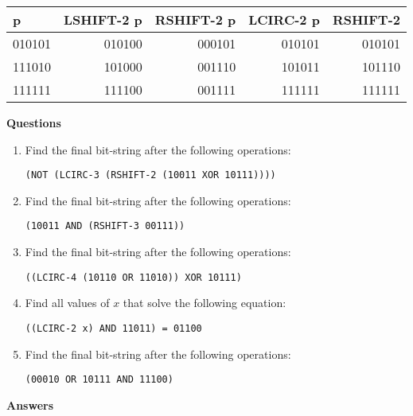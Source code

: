 \documentclass[12pt,letterpaper]{article}
\begin{document}
\begin{center}
  \begin{tabular}{| l || r | r | r | r |}
    \hline
    p & \textbf{LSHIFT-2} p & \textbf{RSHIFT-2} p & \textbf{LCIRC-2} p & \textbf{RSHIFT-2} \\
    \hline \hline
    010101 & 010100 & 000101 & 010101 & 010101 \\
    111010 & 101000 & 001110 & 101011 & 101110 \\
    111111 & 111100 & 001111 & 111111 & 111111 \\
    \hline
  \end{tabular}
\end{center}

\bigskip
\noindent \textbf{Questions}

\begin{enumerate}
  
\item Find the final bit-string after the following operations:

  \texttt{(NOT (LCIRC-3 (RSHIFT-2 (10011 XOR 10111))))}

\item Find the final bit-string after the following operations:

  \texttt{(10011 AND (RSHIFT-3 00111))}

\item Find the final bit-string after the following operations:

  \texttt{((LCIRC-4 (10110 OR 11010)) XOR 10111)}

\item Find all values of $x$ that solve the following equation:

  \texttt{((LCIRC-2 x) AND 11011) = 01100}

\item Find the final bit-string after the following operations:

  \texttt{(00010 OR 10111 AND 11100)}

\end{enumerate}

\pagebreak
\noindent \textbf{Answers}
\end{document}
